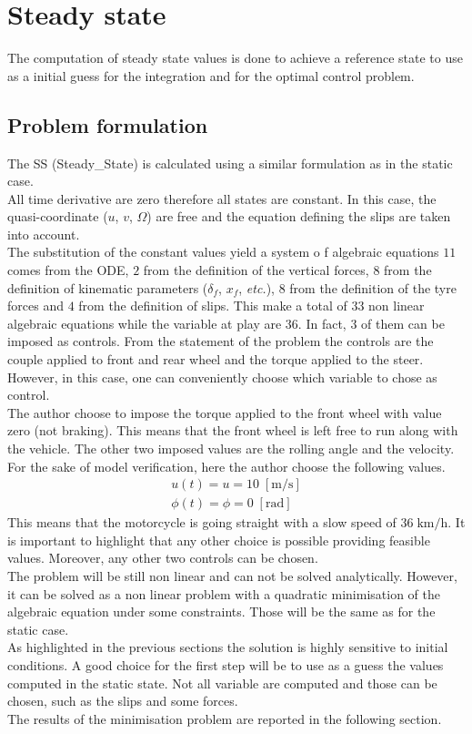 \section{Steady state}
%
The computation of steady state values is done to achieve a reference state to use as a initial guess for the integration and for the optimal control problem. 
%
\subsection{Problem formulation}
%
The SS (Steady_State) is calculated using a similar formulation as in the static case.\\
All time derivative are zero therefore all states are constant. In this case, the quasi-coordinate  ($u$, $v$, $\Omega$) are free and the equation defining the slips are taken into account. \\
The substitution of the constant values yield a system o f algebraic equations $11$ comes from the ODE, $2$ from the definition of the vertical forces, $8$ from the definition of kinematic parameters ($\delta_f$, $x_f$, \textit{etc.}), $8$ from the definition of the tyre forces and $4$ from the definition of slips. This make a total of $33$ non linear algebraic equations while the variable at play are $36$. In fact, $3$ of them can be imposed as controls. From the statement of the problem the controls are the couple applied to front and rear wheel and the torque applied to the steer. However, in this case, one can conveniently choose which variable to chose as control.\\
The author choose to impose the torque applied to the front wheel with value zero (not braking). This means that the front wheel is left free to run along with the vehicle. The other two imposed values are the rolling angle and the velocity. For the sake of model verification, here the author choose the following values.
%
\begin{equation}
    \begin{array}{l}
        u(t) = u = 10 \; [\si{\metre/\second}]\\
        \phi(t) = \phi = 0 \; [\si{\radian}]
    \end{array}
\end{equation}
%
This means that the motorcycle is going straight with a slow speed of $36\;\si{\kilo\metre/\hour}$. 
It is important to highlight that any other choice is possible providing feasible values. Moreover, any other two controls can be chosen.\\
The problem will be still non linear and can not be solved analytically. However, it can be solved as a non linear problem with a quadratic minimisation of the algebraic equation under some constraints. Those will be the same as for the static case.\\
As highlighted in the previous sections the solution is highly sensitive to initial conditions. A good choice for the first step will be to use as a guess the values computed in the static state. Not all variable are computed and those can be chosen, such as the slips and some forces.\\
The results of the minimisation problem are reported in the following section.
%
